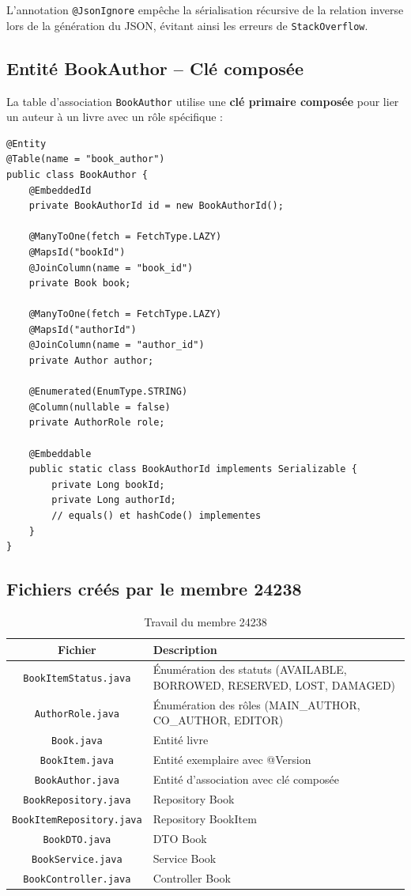 \documentclass[12pt,a4paper,twoside]{report}
\begin{document}
L'annotation \texttt{@JsonIgnore} empêche la sérialisation récursive de la relation inverse lors de la génération du JSON, évitant ainsi les erreurs de \texttt{StackOverflow}.

\subsection{Entité BookAuthor -- Clé composée}

La table d'association \texttt{BookAuthor} utilise une \textbf{clé primaire composée} pour lier un auteur à un livre avec un rôle spécifique :

\begin{lstlisting}[caption=BookAuthor avec clé composée]
@Entity
@Table(name = "book_author")
public class BookAuthor {
    @EmbeddedId
    private BookAuthorId id = new BookAuthorId();

    @ManyToOne(fetch = FetchType.LAZY)
    @MapsId("bookId")
    @JoinColumn(name = "book_id")
    private Book book;

    @ManyToOne(fetch = FetchType.LAZY)
    @MapsId("authorId")
    @JoinColumn(name = "author_id")
    private Author author;

    @Enumerated(EnumType.STRING)
    @Column(nullable = false)
    private AuthorRole role;

    @Embeddable
    public static class BookAuthorId implements Serializable {
        private Long bookId;
        private Long authorId;
        // equals() et hashCode() implementes
    }
}
\end{lstlisting}

\subsection{Fichiers créés par le membre 24238}

\begin{table}[H]
\centering
\caption{Travail du membre 24238}
\begin{tabularx}{\textwidth}{c X}
\hline
\rowcolor[gray]{0.9}
\textbf{Fichier} & \textbf{Description} \\
\hline
\texttt{BookItemStatus.java} & Énumération des statuts (AVAILABLE, BORROWED, RESERVED, LOST, DAMAGED) \\
\texttt{AuthorRole.java} & Énumération des rôles (MAIN\_AUTHOR, CO\_AUTHOR, EDITOR) \\
\texttt{Book.java} & Entité livre \\
\texttt{BookItem.java} & Entité exemplaire avec @Version \\
\texttt{BookAuthor.java} & Entité d'association avec clé composée \\
\texttt{BookRepository.java} & Repository Book \\
\texttt{BookItemRepository.java} & Repository BookItem \\
\texttt{BookDTO.java} & DTO Book \\
\texttt{BookService.java} & Service Book \\
\texttt{BookController.java} & Controller Book \\
\hline
\end{tabularx}
\end{table}
\end{document}
